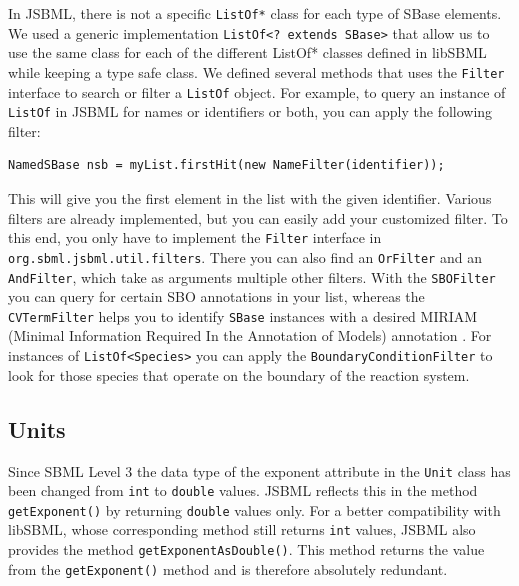 \documentclass[
  BCOR12mm,
  letterpaper,
  11pt,
  headsepline,
  pointlessnumbers,
  tablecaptionabove,
  onelinecaption,
  headinclude,
  appendixprefix,
  idxtotoc,
  bibtotoc,
  twoside,
  titlepage
]{scrartcl}
\begin{document}
In JSBML, there is not a specific
\texttt{ListOf*} class for each type of SBase
elements. We used a generic implementation 
\texttt{ListOf<?~extends SBase>} that allow us to use the same class for each of
the different {ListOf*} classes defined in libSBML while keeping a type safe
class. We defined several methods that uses the \texttt{Filter} interface to
search or filter a \texttt{ListOf} object. For example, to query an instance of
\texttt{ListOf} in JSBML for names or identifiers or both, you can apply the following filter:
\begin{lstlisting}
NamedSBase nsb = myList.firstHit(new NameFilter(identifier));
\end{lstlisting}
This will give you the first element in the list with the given identifier.
Various filters are already implemented, but you can easily add your 
customized filter. To this end, you only have to implement the \texttt{Filter}
interface in \texttt{org.sbml.jsbml.util.filters}. There you can also find an
\texttt{OrFilter} and an \texttt{AndFilter}, which take as arguments multiple other
filters. With the \texttt{SBOFilter} you can query for certain SBO  annotations \citep{Novere2006,Novere2006b} in
your list, whereas the \texttt{CVTermFilter} helps you to identify \texttt{SBase}
instances with a desired MIRIAM (Minimal Information Required In the Annotation of Models) annotation \citep{Novere2005}. For instances of
\texttt{ListOf<Species>} you can apply the \texttt{BoundaryConditionFilter} to look
for those species that operate on the boundary of the reaction system.


\subsection{Units}

Since SBML Level 3 the data type of the exponent attribute in the \texttt{Unit}
class has been changed from \texttt{int} to \texttt{double} values.
JSBML
reflects this in the method \texttt{getExponent()} by returning \texttt{double}
values only. For a better compatibility with libSBML, whose corresponding method
still returns \texttt{int} values, JSBML also provides the method
\texttt{getExponentAsDouble()}. This method returns the value from the
\texttt{getExponent()} method and is therefore absolutely redundant.
\end{document}
